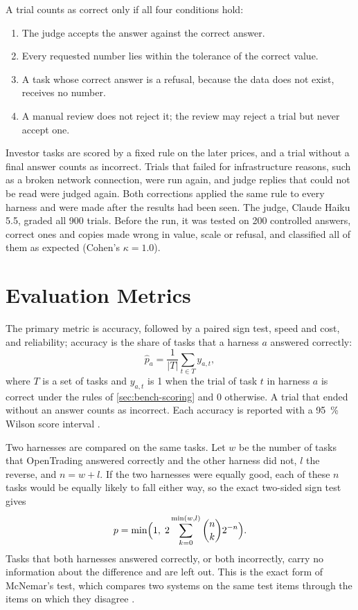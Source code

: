 \label{sec:bench-scoring}
A trial counts as correct only if all four conditions hold:
\begin{enumerate}
  \item The judge accepts the answer against the correct answer.
  \item Every requested number lies within the tolerance of the correct value.
  \item A task whose correct answer is a refusal, because the data does not exist, receives no number.
  \item A manual review does not reject it; the review may reject a trial but never accept one.
\end{enumerate}
Investor tasks are scored by a fixed rule on the later prices, and a trial without a final answer counts as incorrect.
Trials that failed for infrastructure reasons, such as a broken network connection, were run again, and judge replies that could not be read were judged again.
Both corrections applied the same rule to every harness and were made after the results had been seen.
The judge, Claude Haiku 5.5, graded all 900 trials.
Before the run, it was tested on 200 controlled answers, correct ones and copies made wrong in value, scale or refusal, and classified all of them as expected (Cohen's $\kappa = 1.0$).

\section{Evaluation Metrics}\label{sec:metrics}
The primary metric is accuracy, followed by a paired sign test, speed and cost, and reliability; accuracy is the share of tasks that a harness $a$ answered correctly:
\begin{equation}\label{eq:accuracy}
  \hat{p}_a=\frac{1}{|T|}\sum_{t\in T} y_{a,t},
\end{equation}
where $T$ is a set of tasks and $y_{a,t}$ is 1 when the trial of task $t$ in harness $a$ is correct under the rules of \cref{sec:bench-scoring} and 0 otherwise.
A trial that ended without an answer counts as incorrect.
Each accuracy is reported with a \qty{95}{\percent} Wilson score interval \parencite{wilson1927probable}.

Two harnesses are compared on the same tasks.
Let $w$ be the number of tasks that OpenTrading answered correctly and the other harness did not, $l$ the reverse, and $n=w+l$.
If the two harnesses were equally good, each of these $n$ tasks would be equally likely to fall either way, so the exact two-sided sign test \parencite{dixon1946sign} gives
\begin{equation}\label{eq:sign-test}
  p=\min\Bigl(1,\;2\sum_{k=0}^{\min(w,l)}\binom{n}{k}2^{-n}\Bigr).
\end{equation}
Tasks that both harnesses answered correctly, or both incorrectly, carry no information about the difference and are left out.
This is the exact form of McNemar's test, which compares two systems on the same test items through the items on which they disagree \parencite{dietterich1998approximate}.

